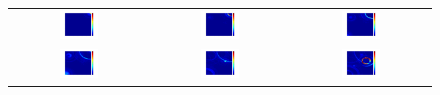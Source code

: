 \begin{figure}[H]
\begin{tabular}{ccc}
	\includegraphics[width=0.3\textwidth]{linea_timerev/figuras/timereversal/ev2/tr224.png}&
	\includegraphics[width=0.3\textwidth]{linea_timerev/figuras/timereversal/ev2/tr225.png}&
	\includegraphics[width=0.3\textwidth]{linea_timerev/figuras/timereversal/ev2/tr226.png}\\
	\includegraphics[width=0.3\textwidth]{linea_timerev/figuras/timereversal/ev2/tr227.png}&
	\includegraphics[width=0.3\textwidth]{linea_timerev/figuras/timereversal/ev2/tr228.png}&
	\includegraphics[width=0.3\textwidth]{linea_timerev/figuras/timereversal/ev2/tr229.png}\\

\end{tabular}
\end{figure}
